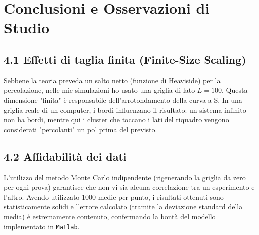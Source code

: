 \documentclass[11pt,a4paper]{article}
\begin{document}
\section{Conclusioni e Osservazioni di Studio}
\subsection*{4.1 Effetti di taglia finita (Finite-Size Scaling)}
Sebbene la teoria preveda un salto netto (funzione di Heaviside) per la percolazione, nelle mie simulazioni ho usato una griglia di lato $L=100$. Questa dimensione "finita" è responsabile dell'arrotondamento della curva a S. In una griglia reale di un computer, i bordi influenzano il risultato: un sistema infinito non ha bordi, mentre qui i cluster che toccano i lati del riquadro vengono considerati "percolanti" un po' prima del previsto.

\subsection*{4.2 Affidabilità dei dati}
L'utilizzo del metodo Monte Carlo indipendente (rigenerando la griglia da zero per ogni prova) garantisce che non vi sia alcuna correlazione tra un esperimento e l'altro. Avendo utilizzato $1000$ medie per punto, i risultati ottenuti sono statisticamente solidi e l'errore calcolato (tramite la deviazione standard della media) è estremamente contenuto, confermando la bontà del modello implementato in \texttt{Matlab}.
\end{document}
